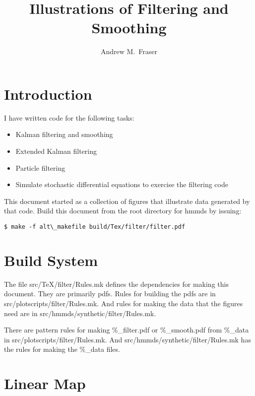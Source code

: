 \documentclass[12pt]{article}
\title{Illustrations of Filtering and Smoothing}
\author{Andrew M.\ Fraser}
\begin{document}
\maketitle

\section{Introduction}
\label{sec:introduction}

I have written code for the following tasks:
\begin{itemize}
\item Kalman filtering and smoothing
\item Extended Kalman filtering
\item Particle filtering
\item Simulate stochastic differential equations to exercise the
  filtering code
\end{itemize}
This document started as a collection of figures that illustrate data
generated by that code.  Build this document from the root directory
for hmmds by issuing:
\begin{verbatim}
$ make -f alt\_makefile build/Tex/filter/filter.pdf
\end{verbatim}

\section{Build System}

The file src/TeX/filter/Rules.mk defines the dependencies for making
this document.  They are primarily pdfs.  Rules for building the pdfs
are in src/plotscripts/filter/Rules.mk.  And rules for making the data
that the figures need are in src/hmmds/synthetic/filter/Rules.mk.

There are pattern rules for making \%\_filter.pdf or \%\_smooth.pdf from
\%\_data in src/plotscripts/filter/Rules.mk.  And
src/hmmds/synthetic/filter/Rules.mk has the rules for making the
\%\_data files.

\section{Linear Map}
\label{sec:linear_map}
\end{document}
